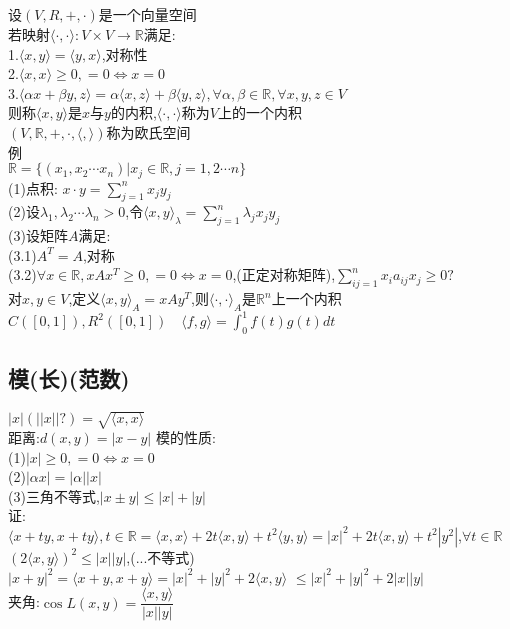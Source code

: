\documentclass[11pt, a4paper, UTF8]{ctexart}
\begin{document}
\subsection{}
设$(V,R,+,\cdot)$是一个向量空间\\
若映射$\langle\cdot,\cdot\rangle:V\times V\to\mathbb{R}$满足:\\
1.$\langle x,y\rangle=\langle y,x\rangle$,对称性\\
2.$\langle x,x\rangle\ge0,=0\Leftrightarrow x=0$\\
3.$\langle\alpha x+\beta y,z\rangle=\alpha\langle x,z\rangle+\beta\langle y,z\rangle,\forall\alpha,\beta\in\mathbb{R},\forall x,y,z\in V$\\
则称$\langle x,y\rangle$是$x$与$y$的内积,$\langle\cdot,\cdot\rangle$称为$V$上的一个内积\\
$(V,\mathbb{R},+,\cdot,\langle,\rangle)$称为欧氏空间\\
例\\
$\mathbb{R}=\{(x_1,x_2\cdots x_n)|x_j\in\mathbb{R},j=1,2\cdots n\}$\\
(1)点积: $x\cdot y=\sum\limits_{j=1}^nx_jy_j$\\
(2)设$\lambda_1,\lambda_2\cdots\lambda_n>0$,令$\langle x,y\rangle_\lambda=\sum\limits_{j=1}^n\lambda_jx_jy_j$\\
(3)设矩阵$A$满足:\\
(3.1)$A^T=A$,对称\\
(3.2)$\forall x\in\mathbb{R},xAx^T\ge0,=0\Leftrightarrow x=0$,(正定对称矩阵),$\sum\limits_{ij=1}^nx_ia_{ij}x_j\ge0?$\\
对$x,y\in V$,定义$\langle x,y\rangle_A=xAy^T$,则$\langle\cdot,\cdot\rangle_A$是$\mathbb{R}^n$上一个内积\\
$C([0,1]),R^2([0,1])\quad\langle f,g\rangle=\int_0^1f(t)g(t)dt$\\
\subsection{模(长)(范数)}
$|x|(||x||?)=\sqrt{\langle x,x\rangle}$\\
距离:$d(x,y)=|x-y|$
模的性质:\\
(1)$|x|\ge0,=0\Leftrightarrow x=0$\\
(2)$|\alpha x|=|\alpha||x|$\\
(3)三角不等式,$|x\pm y|\le|x|+|y|$\\
证:\\
$\langle x+ty,x+ty\rangle,t\in\mathbb{R}=\langle x,x\rangle+2t\langle x,y\rangle+t^2\langle y,y\rangle=|x|^2+2t\langle x,y\rangle+t^2|y^2|$,$\forall t\in\mathbb{R}$\\
$(2\langle x,y\rangle)^2\le|x||y|$,(...不等式)\\
$|x+y|^2=\langle x+y,x+y\rangle=|x|^2+|y|^2+2\langle x,y\rangle$
$\le|x|^2+|y|^2+2|x||y|$\\
夹角:$\cos L(x,y)=\dfrac{\langle x,y\rangle}{|x||y|}$\\
\end{document}
